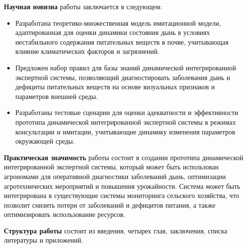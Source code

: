 \textbf{Научная новизна} работы заключается в следующем:
\begin{itemize}
    \item Разработана теоретико-множественная модель имитационной модели, адаптированная для оценки динамики состояния дынь в условиях нестабильного содержания питательных веществ в почве, учитывающая влияние климатических факторов и загрязнений.
    \item Предложен набор правил для базы знаний динамической интегрированной экспертной системы, позволяющий диагностировать заболевания дынь и дефициты питательных веществ на основе визуальных признаков и параметров внешней среды.
    \item Разработаны тестовые сценарии для оценки адекватности и эффективности прототипа динамической интегрированной экспертной системы в режимах консультации и имитации, учитывающие динамику изменения параметров окружающей среды.
\end{itemize}

\textbf{Практическая значимость} работы состоит в создании прототипа динамической интегрированной экспертной системы, который может быть использован агрономами для оперативной диагностики заболеваний дынь, оптимизации агротехнических мероприятий и повышения урожайности. Система может быть интегрирована в существующие системы мониторинга сельского хозяйства, что позволит снизить потери от заболеваний и дефицитов питания, а также оптимизировать использование ресурсов.

\textbf{Структура работы} состоит из введения, четырех глав, заключения, списка литературы и приложений.
